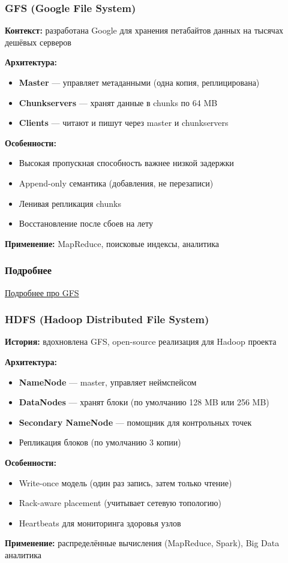 \documentclass{beamer}
\begin{document}
\begin{frame}
\frametitle{GFS (Google File System)}

\textbf{Контекст:} разработана Google для хранения петабайтов данных на тысячах дешёвых серверов

\textbf{Архитектура:}
\begin{itemize}
  \item \textbf{Master} — управляет метаданными (одна копия, реплицирована)
  \item \textbf{Chunkservers} — хранят данные в chunks по 64 MB
  \item \textbf{Clients} — читают и пишут через master и chunkservers
\end{itemize}

\textbf{Особенности:}
\begin{itemize}
  \item Высокая пропускная способность важнее низкой задержки
  \item Append-only семантика (добавления, не перезаписи)
  \item Ленивая репликация chunks
  \item Восстановление после сбоев на лету
\end{itemize}

\textbf{Применение:} MapReduce, поисковые индексы, аналитика

\end{frame}

\begin{frame}
\frametitle{Подробнее}

\href{http://fac-staff.seattleu.edu/zhuy/web/teaching/Spring10/csse550/GFS-lecture.pdf}{Подробнее про GFS}

\end{frame}

\begin{frame}
\frametitle{HDFS (Hadoop Distributed File System)}

\textbf{История:} вдохновлена GFS, open-source реализация для Hadoop проекта

\textbf{Архитектура:}
\begin{itemize}
  \item \textbf{NameNode} — master, управляет неймспейсом
  \item \textbf{DataNodes} — хранят блоки (по умолчанию 128 MB или 256 MB)
  \item \textbf{Secondary NameNode} — помощник для контрольных точек
  \item Репликация блоков (по умолчанию 3 копии)
\end{itemize}

\textbf{Особенности:}
\begin{itemize}
  \item Write-once модель (один раз запись, затем только чтение)
  \item Rack-aware placement (учитывает сетевую топологию)
  \item Heartbeats для мониторинга здоровья узлов
\end{itemize}

\textbf{Применение:} распределённые вычисления (MapReduce, Spark), Big Data аналитика

\end{frame}
\end{document}
